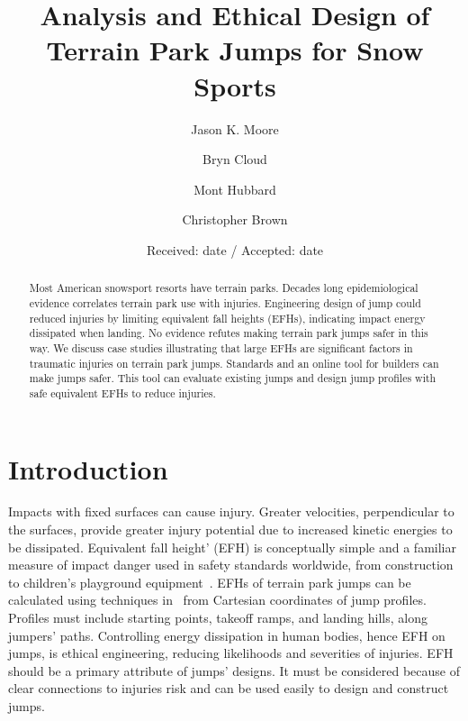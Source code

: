 \documentclass[smallextended]{svjour3}       %
\begin{document}
\title{Analysis and Ethical Design of Terrain Park Jumps for Snow Sports}

\author{Jason K. Moore      \and
        Bryn Cloud          \and
        Mont Hubbard        \and
        Christopher Brown
}



\date{Received: date / Accepted: date}

\maketitle

\begin{abstract}
  Most American snowsport resorts have terrain parks. Decades long
  epidemiological evidence correlates terrain park use with injuries.
  Engineering design of jump could reduced injuries by limiting equivalent fall
  heights (EFHs), indicating impact energy dissipated when landing. No evidence
  refutes  making terrain park jumps safer in this way. We discuss case studies
  illustrating that large EFHs are significant factors in traumatic injuries on
  terrain park jumps. Standards and an online tool for builders can make jumps
  safer. This tool can evaluate existing jumps and design jump profiles with
  safe equivalent EFHs to reduce injuries.
\end{abstract}

\section{Introduction}
\label{intro}
%
Impacts with fixed surfaces can  cause injury. Greater velocities,
perpendicular to the surfaces, provide greater injury potential due to
increased kinetic energies to be dissipated. Equivalent fall height' (EFH) is
conceptually simple and a familiar measure of impact danger used in safety
standards worldwide, from construction~\cite{OSHA2021} to children's playground
equipment~\cite{Chalmers1996}. EFHs of terrain park jumps can be calculated
using techniques in~\cite{McNeil2012} from Cartesian coordinates of jump
profiles. Profiles must include starting points, takeoff ramps, and landing
hills, along jumpers' paths. Controlling energy dissipation in human bodies,
hence EFH on jumps, is ethical engineering, reducing likelihoods and severities
of injuries. EFH should be a primary attribute of jumps' designs. It must be
considered because of clear connections to injuries risk and  can be used
easily to design and construct jumps.
\end{document}
